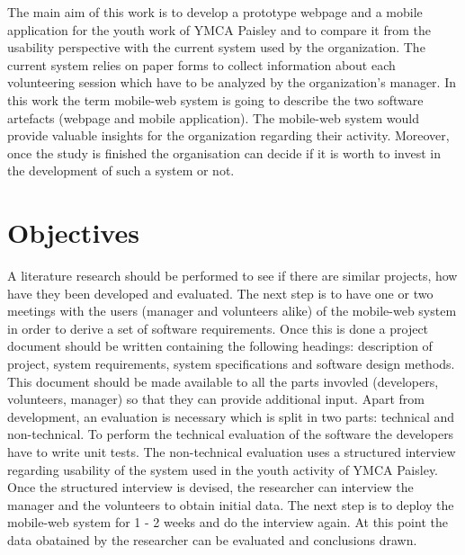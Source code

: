 \documentclass[version=last,fontsize=13pt]{scrartcl}
\begin{document}
\indent
The main aim of this work is to develop a prototype webpage and a mobile application for the youth work of YMCA Paisley and to compare it from the usability perspective with the current system used by the organization. The current system  relies on paper forms to collect information about each volunteering session which have to be analyzed by the organization's manager.  In this work the term mobile-web system is going to describe the two software artefacts (webpage and mobile application). The mobile-web system would provide valuable insights for the organization  regarding their activity. Moreover, once the study is finished the organisation can decide if it is worth to invest in the development of such a system  or not. 

\section{Objectives}%
A literature research should be performed to see if there are similar projects, how have they been developed and evaluated. The next step is to have one or two meetings with the users (manager and volunteers alike) of the mobile-web system in order to derive a  set of software requirements. Once this is done a project document should be written containing the following headings: description of project, system requirements, system specifications and software design methods. This document should be made available to all the parts invovled (developers, volunteers, manager) so that they can provide additional input. Apart from development, an evaluation is necessary which is split in two parts: technical  and non-technical. To perform the technical evaluation of the software the developers have to write unit tests. The non-technical evaluation uses a structured interview regarding usability of the system used in the youth activity of YMCA Paisley. Once the structured interview is devised, the researcher can interview the manager and the volunteers to obtain initial data. The next step is to deploy the mobile-web system for 1 - 2 weeks and do the interview again. At this point the data obatained by the researcher can be evaluated and conclusions drawn.
\end{document}
